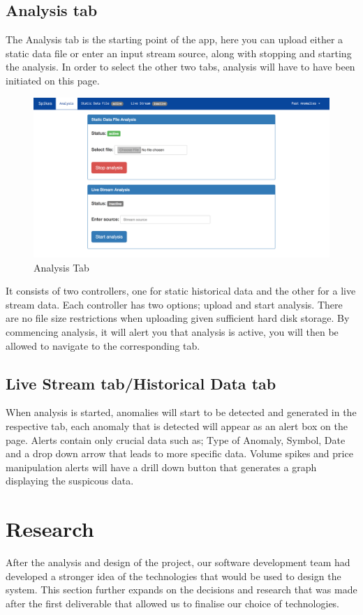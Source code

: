 \documentclass[12pt]{article}
\begin{document}
  \subsection{Analysis tab}
  The Analysis tab is the starting point of the app, here you can upload either a static data file or enter an input stream source, along with stopping and starting the analysis.
  In order to select the other two tabs, analysis will have to have been initiated on this page.
  \begin{figure}[H]
  \centering
  \includegraphics[width=120mm]{analysisTab.png}
  \caption{Analysis Tab}
  \end{figure}
  It consists of two controllers, one for static historical data and the other for a live stream data.
  Each controller has two options; upload and start analysis. There are no file size restrictions when uploading given sufficient hard disk storage.
  By commencing analysis, it will alert you that analysis is active, you will then be allowed to navigate to the corresponding tab.
  \subsection{Live Stream tab/Historical Data tab}
  When analysis is started, anomalies will start to be detected and generated in the respective tab, each anomaly that is detected will appear as an alert box on the page.
  Alerts contain only crucial data such as; Type of Anomaly, Symbol, Date and a drop down arrow that leads to more specific data.
  Volume spikes and price manipulation alerts will have a drill down button that generates a graph displaying the suspicous data.
\section{Research}
  After the analysis and design of the project, our software development team had developed a stronger idea
  of the technologies that would be used to design the system. This section further expands on the decisions and
  research that was made after the first deliverable that allowed us to finalise our choice of technologies.
\end{document}
